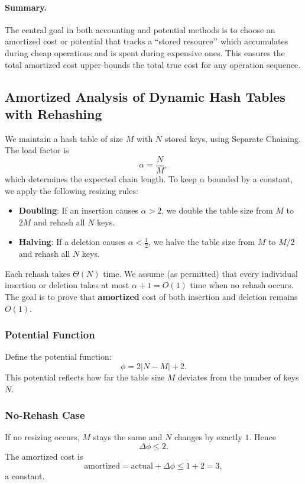 \documentclass[9pt]{extarticle}
\begin{document}
\paragraph{Summary.}
The central goal in both accounting and potential methods is to choose an
amortized cost or potential that tracks a “stored resource’’ which accumulates
during cheap operations and is spent during expensive ones.  
This ensures the total amortized cost upper-bounds the total true cost for any
operation sequence.

\subsection{Amortized Analysis of Dynamic Hash Tables with Rehashing}

We maintain a hash table of size \(M\) with \(N\) stored keys, using Separate
Chaining. The load factor is
\[
\alpha = \frac{N}{M},
\]
which determines the expected chain length. To keep \(\alpha\) bounded by a
constant, we apply the following resizing rules:
\begin{itemize}
    \item \textbf{Doubling}: If an insertion causes \(\alpha > 2\), we double
          the table size from \(M\) to \(2M\) and rehash all \(N\) keys.
    \item \textbf{Halving}: If a deletion causes \(\alpha < \tfrac12\), we halve
          the table size from \(M\) to \(M/2\) and rehash all \(N\) keys.
\end{itemize}
Each rehash takes \(\Theta(N)\) time. We assume (as permitted) that every
individual insertion or deletion takes at most \(\alpha + 1 = O(1)\) time when
no rehash occurs. The goal is to prove that \textbf{amortized} cost of both
insertion and deletion remains \(O(1)\).

\subsubsection*{Potential Function}
Define the potential function:
\[
\phi = 2|N - M| + 2.
\]
This potential reflects how far the table size \(M\) deviates from the number
of keys \(N\).

\subsubsection*{No-Rehash Case}
If no resizing occurs, \(M\) stays the same and \(N\) changes by exactly \(1\).
Hence
\[
\Delta \phi \le 2.
\]
The amortized cost is
\[
\text{amortized} = \text{actual} + \Delta \phi \le 1 + 2 = 3,
\]
a constant.
\end{document}
